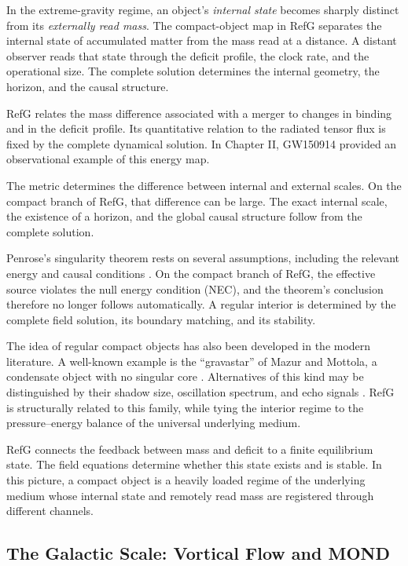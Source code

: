 \documentclass[11pt,a4paper]{article}
\begin{document}
In the extreme-gravity regime, an object's \emph{internal state} becomes sharply distinct from its \emph{externally read mass}. The compact-object map in RefG separates the internal state of accumulated matter from the mass read at a distance. A distant observer reads that state through the deficit profile, the clock rate, and the operational size. The complete solution determines the internal geometry, the horizon, and the causal structure.

RefG relates the mass difference associated with a merger to changes in binding and in the deficit profile. Its quantitative relation to the radiated tensor flux is fixed by the complete dynamical solution. In Chapter II, GW150914 provided an observational example of this energy map.

The metric determines the difference between internal and external scales. On the compact branch of RefG, that difference can be large. The exact internal scale, the existence of a horizon, and the global causal structure follow from the complete solution.

Penrose's singularity theorem rests on several assumptions, including the relevant energy and causal conditions \citep{penrose1965}. On the compact branch of RefG, the effective source violates the null energy condition (NEC), and the theorem's conclusion therefore no longer follows automatically. A regular interior is determined by the complete field solution, its boundary matching, and its stability.

The idea of regular compact objects has also been developed in the modern literature. A well-known example is the ``gravastar'' of Mazur and Mottola, a condensate object with no singular core \citep{mazur2004}. Alternatives of this kind may be distinguished by their shadow size, oscillation spectrum, and echo signals \citep{cardoso2019}. RefG is structurally related to this family, while tying the interior regime to the pressure--energy balance of the universal underlying medium.

RefG connects the feedback between mass and deficit to a finite equilibrium state. The field equations determine whether this state exists and is stable. In this picture, a compact object is a heavily loaded regime of the underlying medium whose internal state and remotely read mass are registered through different channels.

\subsection{The Galactic Scale: Vortical Flow and MOND}
\end{document}
